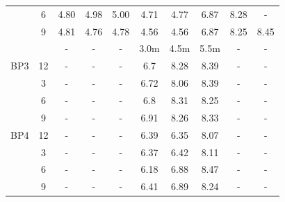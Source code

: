 \begin{table}[h]
{\begin{tabular}{l|c|c|c|c|l|l|l|l|l}
\multicolumn{1}{c|}{} & 6 & 4.80 & 4.98 & 5.00 & \multicolumn{1}{c|}{4.71} & \multicolumn{1}{c|}{4.77} & \multicolumn{1}{c|}{6.87} & \multicolumn{1}{c|}{8.28} & \multicolumn{1}{c}{-} \\ 
\multicolumn{1}{c|}{} & 9 & 4.81 & 4.76 & 4.78 & \multicolumn{1}{c|}{4.56} & \multicolumn{1}{c|}{4.56} & \multicolumn{1}{c|}{6.87} & \multicolumn{1}{c|}{8.25} & \multicolumn{1}{c}{8.45} \\ 
\hline
\multicolumn{1}{c|}{} &  & - & - & - & \multicolumn{1}{c|}{3.0m} & \multicolumn{1}{c|}{4.5m} & \multicolumn{1}{c|}{5.5m} & \multicolumn{1}{c|}{-} & \multicolumn{1}{c}{-} \\ 
\hline
\multicolumn{1}{c|}{BP3} & 12 & - & - & - & \multicolumn{1}{c|}{6.7} & \multicolumn{1}{c|}{8.28} & \multicolumn{1}{c|}{8.39} & \multicolumn{1}{c|}{-} & \multicolumn{1}{c}{-} \\ 
\multicolumn{1}{c|}{} & 3 & - & - & - & \multicolumn{1}{c|}{6.72} & \multicolumn{1}{c|}{8.06} & \multicolumn{1}{c|}{8.39} & \multicolumn{1}{c|}{-} & \multicolumn{1}{c}{-} \\ 
\multicolumn{1}{c|}{} & 6 & - & - & - & \multicolumn{1}{c|}{6.8} & \multicolumn{1}{c|}{8.31} & \multicolumn{1}{c|}{8.25} & \multicolumn{1}{c|}{-} & \multicolumn{1}{c}{-} \\ 
\multicolumn{1}{c|}{} & 9 & - & - & - & \multicolumn{1}{c|}{6.91} & \multicolumn{1}{c|}{8.26} & \multicolumn{1}{c|}{8.33} & \multicolumn{1}{c|}{-} & \multicolumn{1}{c}{-} \\ 
\hline
\multicolumn{1}{c|}{BP4} & 12 & - & - & - & \multicolumn{1}{c|}{6.39} & \multicolumn{1}{c|}{6.35} & \multicolumn{1}{c|}{8.07} & \multicolumn{1}{c|}{-} & \multicolumn{1}{c}{-} \\ 
\multicolumn{1}{c|}{} & 3 & - & - & - & \multicolumn{1}{c|}{6.37} & \multicolumn{1}{c|}{6.42} & \multicolumn{1}{c|}{8.11} & \multicolumn{1}{c|}{-} & \multicolumn{1}{c}{-} \\ 
\multicolumn{1}{c|}{} & 6 & - & - & - & \multicolumn{1}{c|}{6.18} & \multicolumn{1}{c|}{6.88} & \multicolumn{1}{c|}{8.47} & \multicolumn{1}{c|}{-} & \multicolumn{1}{c}{-} \\ 
\multicolumn{1}{c|}{} & 9 & - & - & - & \multicolumn{1}{c|}{6.41} & \multicolumn{1}{c|}{6.89} & \multicolumn{1}{c|}{8.24} & \multicolumn{1}{c|}{-} & \multicolumn{1}{c}{-} \\ 
\hline
\end{tabular}


	}
\end{table}


